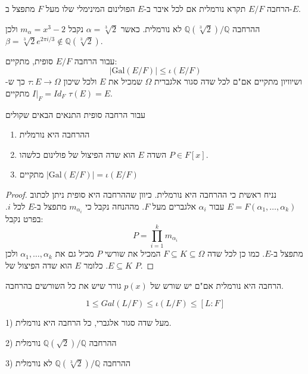 \documentclass{tstextbook}
\begin{document}
\begin{definition}
הרחבה \(E / F\) תקרא נורמלית אם לכל איבר ב-\(E\) הפולינום המינימלי שלו מעל \(F\) מתפצל ב-\(E\).

\end{definition}
\begin{example}
ההרחבה \(\mathbb{Q}\left( \sqrt[3]{ 2 }  \right) / \mathbb{Q}\)  לא נורמלית. כאשר  \(\alpha = \sqrt[3]{ 2 }\) נקבל \(m_{\alpha}=x^3 - 2\)   ולכן \(\beta = \sqrt[3]{ 2 }e^{2\pi i/3} \not\in \mathbb{Q}\left( \sqrt[3]{ 2 } \right)\).

\end{example}
\begin{proposition}
עבור הרחבה \(E / F\) סופית, מתקיים:
$$\left\lvert  \mathrm{Gal}( E / F)  \right\rvert \leq \iota (E / F)$$
ושיוויון מתקיים אם"ם לכל שדה סגור אלגברית \(\Omega\) שמכיל את \(E\) ולכל שיכון \(\tau:E \to \Omega\) כך ש-\(I|_{F}=Id_{F}\) מתקיים \(\tau(E)=E\).

\end{proposition}
\begin{proposition}
עבור הרחבה סופית התנאים הבאים שקולים

  \begin{enumerate}
    \item ההרחבה היא נורמלית 


    \item השדה \(E\) הוא שדה הפיצול של פולינום כלשהו \(P \in F[x]\). 


    \item מתקיים \(\left\lvert  \mathrm{Gal}(E / F)  \right\rvert=\iota(E / F)\)


  \end{enumerate}
\end{proposition}
\begin{proof}
נניח ראשית כי ההרחבה היא נורמלית. כיוון שההרחבה היא סופית ניתן לכתוב \(E=F\left( \alpha_{1},\dots,\alpha_{k} \right)\) עבור \(\alpha_{i}\) אלגברים מעל \(F\). מההנחה נקבל כי \(m_{\alpha_{i}}\) מתפצל ב-\(E\) לכל \(i\). בפרט נקבל:
$$P=\prod_{i=1}^{k}m_{\alpha_{i}}$$
מתפצל ב-\(E\). כמו כן לכל שדה \(F\subseteq K \subseteq \Omega\) המכיל את שורשי \(P\) מכיל גם את \(\alpha_{1},\dots,\alpha_{k}\) ולכן \(E\subseteq K\). כלומר \(E\) הוא שדה הפיצול של \(P\).

\end{proof}
\begin{proposition}
הרחבה היא נורמלית אם"ם יש שורש של \(p(x)\) גורר שיש את כל השורשים בהרחבה.

\end{proposition}
\begin{proposition}
$$1 \leq Gal(L / F) \leq \iota( L / F) \leq [L : F]$$

\end{proposition}
\begin{example}
1) מעל שדה סגור אלגברי, כל הרחבה היא נורמלית. 

2) ההרחבה \(\mathbb{Q}\left( \sqrt{ 2 } \right) / \mathbb{Q}\) נורמלית 

3) ההרחבה \(\mathbb{Q}\left( \sqrt[3]{ 2 } \right) / \mathbb{Q}\) לא נורמלית 

\end{example}
\end{document}
